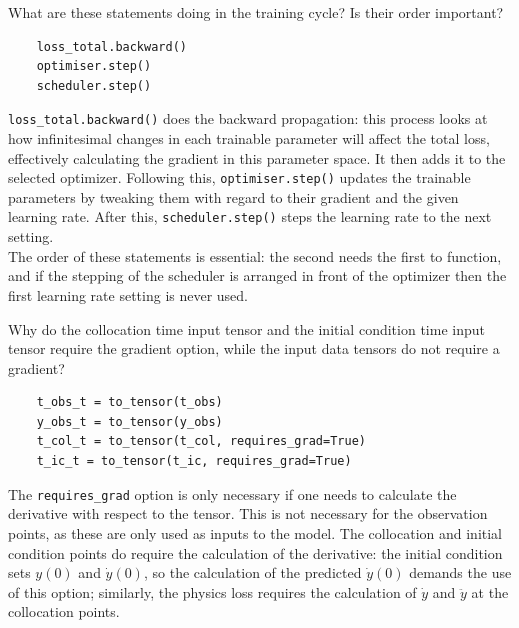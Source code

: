 \documentclass[12pt, a4paper]{report}
\begin{document}
\begin{tcolorbox}[title=Code Question 6,sharp corners, colframe=black, colback=white]
    What are these statements doing in the training cycle? Is their order important?
    \begin{verbatim}
    loss_total.backward()
    optimiser.step()
    scheduler.step()
    \end{verbatim}
\end{tcolorbox}
\verb|loss_total.backward()| does the backward propagation: this process looks at how infinitesimal changes in each trainable parameter will affect the total loss, effectively calculating the gradient in this parameter space. It then adds it to the selected optimizer. Following this, \verb|optimiser.step()| updates the trainable parameters by tweaking them with regard to their gradient and the given learning rate. After this, \verb|scheduler.step()| steps the learning rate to the next setting.\\
The order of these statements is essential: the second needs the first to function, and if the stepping of the scheduler is arranged in front of the optimizer then the first learning rate setting is never used.\\

\begin{tcolorbox}[title=Code Question 7,sharp corners, colframe=black, colback=white]
    Why do the collocation time input tensor and the initial condition time input tensor require the gradient option, while the input data tensors do not require a gradient?
    \begin{verbatim}
    t_obs_t = to_tensor(t_obs)
    y_obs_t = to_tensor(y_obs)
    t_col_t = to_tensor(t_col, requires_grad=True)
    t_ic_t = to_tensor(t_ic, requires_grad=True)
    \end{verbatim}
\end{tcolorbox}
The \verb|requires_grad| option is only necessary if one needs to calculate the derivative with respect to the tensor. This is not necessary for the observation points, as these are only used as inputs to the model. The collocation and initial condition points do require the calculation of the derivative: the initial condition sets $y(0)$ and $\dot{y}(0)$, so the calculation of the predicted $\dot{y}(0)$ demands the use of this option; similarly, the physics loss requires the calculation of $\dot{y}$ and $\ddot{y}$ at the collocation points.\\
\end{document}
